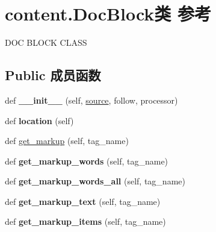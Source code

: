 \hypertarget{classcontent_1_1_doc_block}{}\section{content.\+Doc\+Block类 参考}
\label{classcontent_1_1_doc_block}


D\+OC B\+L\+O\+CK C\+L\+A\+SS  


\subsection*{Public 成员函数}
\begin{DoxyCompactItemize}
\item 
\mbox{\label{classcontent_1_1_doc_block_a5e28bc63ef3ca2a983f3803e2edd7c86}} 
def {\bfseries \+\_\+\+\_\+init\+\_\+\+\_\+} (self, \hyperlink{structsource}{source}, follow, processor)
\item 
\mbox{\label{classcontent_1_1_doc_block_acfbd583d7b0240158feb1c2a5e8fe43b}} 
def {\bfseries location} (self)
\item 
def \hyperlink{classcontent_1_1_doc_block_a23ba3a31d49b8c270fc1e4fc37be6957}{get\+\_\+markup} (self, tag\+\_\+name)
\item 
\mbox{\label{classcontent_1_1_doc_block_ae717593ff84c39c93db46edba0136289}} 
def {\bfseries get\+\_\+markup\+\_\+words} (self, tag\+\_\+name)
\item 
\mbox{\label{classcontent_1_1_doc_block_adf90076b554f3d3bdff8437b919accff}} 
def {\bfseries get\+\_\+markup\+\_\+words\+\_\+all} (self, tag\+\_\+name)
\item 
\mbox{\label{classcontent_1_1_doc_block_a245543b0497bd77647c40cdb3acbedae}} 
def {\bfseries get\+\_\+markup\+\_\+text} (self, tag\+\_\+name)
\item 
\mbox{\label{classcontent_1_1_doc_block_aba841ae355b4077a60ae7495e8081c27}} 
def {\bfseries get\+\_\+markup\+\_\+items} (self, tag\+\_\+name)
\end{DoxyCompactItemize}
